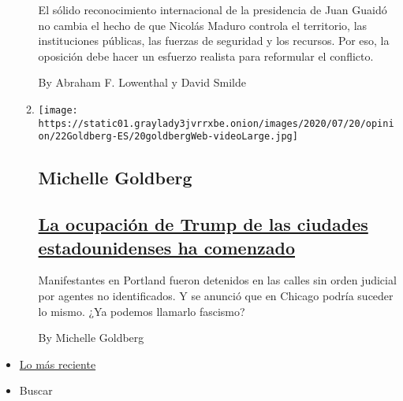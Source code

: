 \begin{enumerate}
\begin{enumerate}
    El sólido reconocimiento internacional de la presidencia de Juan
    Guaidó no cambia el hecho de que Nicolás Maduro controla el
    territorio, las instituciones públicas, las fuerzas de seguridad y
    los recursos. Por eso, la oposición debe hacer un esfuerzo realista
    para reformular el conflicto.

    By Abraham F. Lowenthal y David Smilde
  \item
    \texttt{[image: https://static01.graylady3jvrrxbe.onion/images/2020/07/20/opinion/22Goldberg-ES/20goldbergWeb-videoLarge.jpg]}

    \hypertarget{michelle-goldberg}{%
    \subsection{Michelle Goldberg}\label{michelle-goldberg}}

    \hypertarget{la-ocupaciuxf3n-de-trump-de-las-ciudades-estadounidenses-ha-comenzado}{%
    \subsection{\texorpdfstring{\href{/es/2020/07/22/espanol/opinion/portland-protestas-trump.html}{La
    ocupación de Trump de las ciudades estadounidenses ha
    comenzado}}{La ocupación de Trump de las ciudades estadounidenses ha comenzado}}\label{la-ocupaciuxf3n-de-trump-de-las-ciudades-estadounidenses-ha-comenzado}}

    Manifestantes en Portland fueron detenidos en las calles sin orden
    judicial por agentes no identificados. Y se anunció que en Chicago
    podría suceder lo mismo. ¿Ya podemos llamarlo fascismo?

    By Michelle Goldberg
  \end{enumerate}
\end{enumerate}

\begin{itemize}
\tightlist
\item
  \protect\hyperlink{stream-panel}{Lo más reciente}
\item
  Buscar
\end{itemize}

